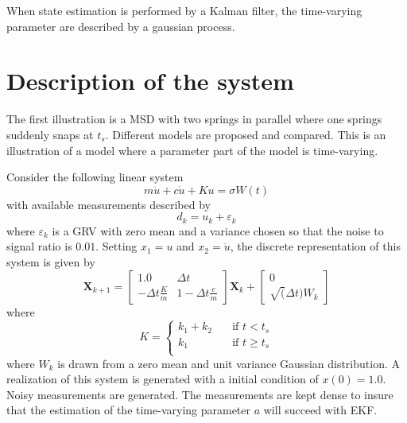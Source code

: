 \documentclass[]{elsarticle}
\renewcommand{\vec}[1]{\mathbf{#1}}
\begin{document}
When state estimation is performed by a Kalman filter, the time-varying parameter are described by a gaussian process. 
\section*{Description of the system}

The first illustration is a MSD with two springs in parallel where one springs suddenly snaps at $t_s$. Different models are proposed and compared. This is an illustration of a model where a parameter part of the model is time-varying.

Consider the following linear system
\begin{equation}
m \ddot{u} + c \dot{u} + K u = \sigma W(t) %
\end{equation}
with available measurements described by
\begin{equation}
d_k = u_k + \varepsilon_k
\end{equation}
where $\varepsilon_k$ is a GRV with zero mean and a variance chosen so that the noise to signal ratio is $0.01$. Setting $x_1 = u$ and $x_2 = \dot{u}$, the discrete representation of this system is given by
\begin{equation}
\vec{X}_{k+1} = 
\begin{bmatrix}
1.0 & \Delta t \\
- \Delta t \frac{K}{m} & 1 - \Delta t \frac{c}{m}
\end{bmatrix}
\vec{X}_k
+
\begin{bmatrix}
0 \\
\sqrt(\Delta t) W_k
\end{bmatrix}
\end{equation}
where
\begin{equation}
K = \begin{cases}
       k_1 + k_2 &\quad \text{if } t < t_s \\
       k_1 &\quad \text{if } t \geq t_s \\
     \end{cases}
\end{equation}
where $W_k$ is drawn from a zero mean and unit variance Gaussian distribution. A realization of this system is generated with a initial condition of $x(0) = 1.0$. Noisy measurements are generated. 
The measurements are kept dense to insure that the estimation of the time-varying parameter $a$ will succeed with EKF.
\end{document}
